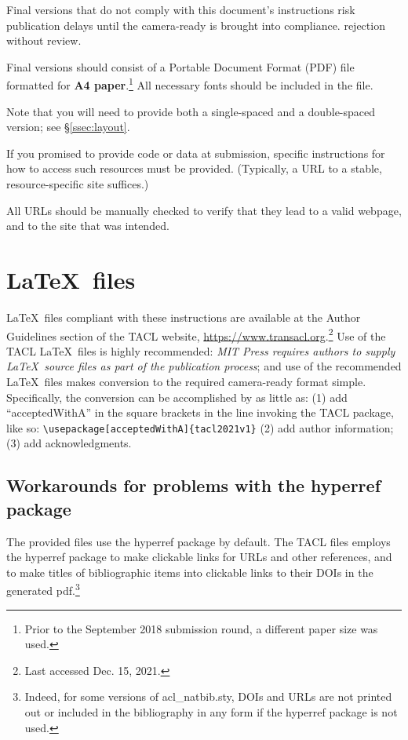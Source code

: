 \documentclass[11pt,a4paper]{article}
\newcommand{\dateOfLastUpdate}{Dec. 15, 2021}
\newcommand{\styleFileVersion}{tacl2021v1}
\newcommand{\Taclpaper}{Final version\xspace}
\newcommand{\Taclpapers}{Final versions\xspace}
\newcommand{\Taclpaper}{Submission\xspace}
\newcommand{\Taclpapers}{{\Taclpaper}s\xspace}
\begin{document}
\Taclpapers that do not comply with this document's instructions
risk
\iftaclpubformat
publication delays until the camera-ready is brought into compliance.
\else
rejection without review.
\fi


\Taclpapers should consist of a Portable Document Format (PDF) file formatted
for  \textbf{A4 paper}.\footnote{Prior to the September 2018 submission round, a
different paper size was used.} All necessary fonts should be
included in the  file.

\iftaclpubformat
Note that you will need to provide both a single-spaced and a double-spaced
version; see \S \ref{ssec:layout}.

If you promised to provide code or data at submission, specific instructions for
how to access such resources must be provided.  (Typically, a URL to a stable,
resource-specific site suffices.)

All URLs should be manually checked to verify that they
lead to a valid webpage, and to the site that was intended.
\fi


\section{\LaTeX\ files}

\LaTeX\ files compliant with these instructions are available at the
Author Guidelines section of the
TACL website, \href{https://www.transacl.org/}
{https://www.transacl.org}.\footnote{Last accessed \dateOfLastUpdate.} Use of the
TACL \LaTeX\ files is highly recommended: \emph{MIT Press requires authors to
supply \LaTeX\ source files as part of the publication process}; and
use of the recommended \LaTeX\ files makes conversion to the
required camera-ready format simple.
\iftaclpubformat
Specifically, the conversion can be accomplished by as little as: (1) add
``acceptedWithA'' in the square brackets in the line invoking the TACL package,
like so:
{\footnotesize {\tt {\textbackslash usepackage}[acceptedWithA]\{\styleFileVersion\}}} (2) add author information;
(3) add acknowledgments.
\fi

\subsection{Workarounds for problems with the hyperref package}

The provided files use the hyperref package by default. The TACL files
employs the hyperref package to make clickable links for URLs and other references,
and to make titles of bibliographic items into clickable links to their DOIs
in the generated pdf.\footnote{Indeed, for some versions of acl\_natbib.sty,
DOIs and URLs are not printed out or included in the bibliography in any form
if the hyperref package is not used.}
\end{document}
